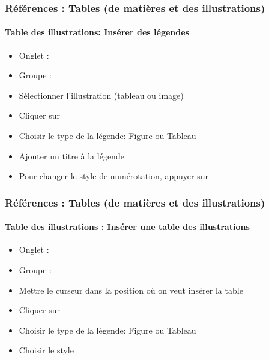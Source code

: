 \documentclass[xcolor=table]{beamer}
\begin{document}
\begin{frame}[t]
\frametitle{Références : Tables (de matières et des illustrations)}
\framesubtitle{Table des illustrations: Insérer des légendes}

\begin{minipage}{0.61\textwidth}
	\begin{itemize}
		\item Onglet : 
		\item Groupe : 
		\item Sélectionner l'illustration (tableau ou image)
		\item Cliquer sur 
		\item Choisir le type de la légende: Figure ou Tableau
		\item Ajouter un titre à la légende
		\item Pour changer le style de numérotation, appuyer sur 
	\end{itemize}
\end{minipage}
\begin{minipage}{0.38\textwidth}
	
	
\end{minipage}

\end{frame}

\begin{frame}[t]
\frametitle{Références : Tables (de matières et des illustrations)}
\framesubtitle{Table des illustrations : Insérer une table des illustrations}

\begin{minipage}{0.61\textwidth}
	\begin{itemize}
		\item Onglet : 
		\item Groupe : 
		\item Mettre le curseur dans la position où on veut insérer la table
		\item Cliquer sur 
		\item Choisir le type de la légende: Figure ou Tableau
		\item Choisir le style
	\end{itemize}
\end{minipage}
\begin{minipage}{0.38\textwidth}
	
	
\end{minipage}

\end{frame}
\end{document}
